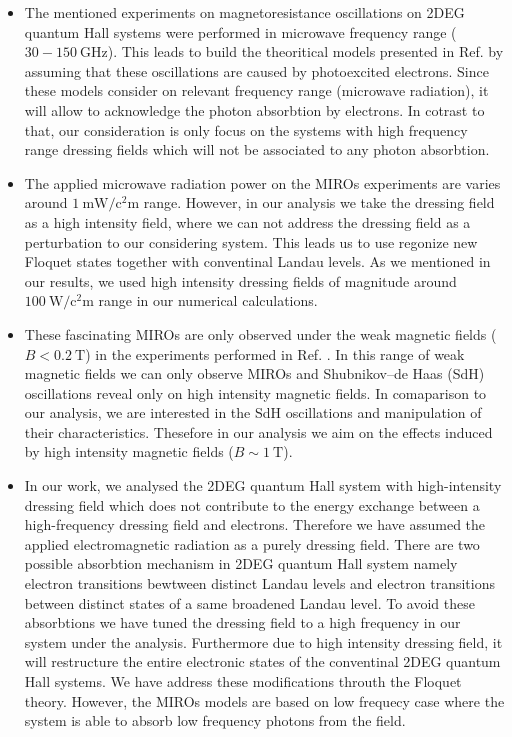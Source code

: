 \documentclass{article}
\begin{document}
\begin{itemize}
  \item
  The mentioned experiments on magnetoresistance oscillations on 2DEG quantum Hall systems \cite{zudov01,mani02,zudov03,mani04} were performed in microwave frequency range ($30 -\SI{150}{\giga\hertz}$). This leads to build the theoritical models presented in Ref. \cite{durst03,dmitriev03} by assuming that these oscillations are caused by photoexcited electrons. Since these models consider on relevant frequency range (microwave radiation), it will allow to acknowledge the photon absorbtion by electrons. In cotrast to that, our consideration is only focus on the systems with high frequency range dressing fields which will not be associated to any photon absorbtion.
  \item
  The applied microwave radiation power on the MIROs experiments \cite{mani02,zudov03} are varies around $\SI{1}{\milli\watt\per\square\centi\metre}$ range. However, in our analysis we take the dressing field as a high intensity field, where we can not address the dressing field as a perturbation to our considering system. This leads us to use regonize new Floquet states together with conventinal Landau levels. As we mentioned in our results, we used high intensity dressing fields of magnitude around $\SI{100}{\watt\per\square\centi\metre}$ range in our numerical calculations.
  \item
  These fascinating MIROs are only observed under the weak magnetic fields ($B < \SI{0.2}{\tesla}$) in the experiments performed in Ref. \cite{zudov01,mani02,zudov03,mani04}. In this range of weak magnetic fields we can only observe MIROs and Shubnikov–de Haas (SdH) oscillations reveal only on high intensity magnetic fields. In comaparison to our analysis, we are  interested in the SdH oscillations and manipulation of their characteristics. Thesefore in our analysis we aim on the effects induced by high intensity magnetic fields ($B \sim \SI{1}{\tesla}$).
  \item
  In our work, we analysed the 2DEG quantum Hall system with high-intensity dressing field which does not contribute to the energy exchange between a high-frequency dressing field and electrons. Therefore we have assumed the applied electromagnetic radiation as a purely dressing field. There are two possible absorbtion mechanism in 2DEG quantum Hall system namely electron transitions bewtween distinct Landau levels and electron transitions between distinct states of a same broadened Landau level. To avoid these absorbtions we have tuned the dressing field to a high frequency in our system under the analysis. Furthermore due to high intensity dressing field, it will restructure the entire electronic states of the conventinal 2DEG quantum Hall systems. We have address these modifications throuth the Floquet theory. However, the MIROs models \cite{durst03,dmitriev03} are based on low frequecy case where the system is able to absorb low frequency photons from the field.
\end{itemize}
\end{document}
